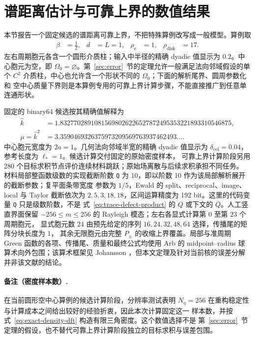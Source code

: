 \section{谱距离估计与可靠上界的数值结果}
\label{sec:results}

本节报告一个固定候选的谱距离可靠上界，不把特殊算例改写成一般模型。算例取
\begin{align*}
  \beta&=\frac12,
  &d&=L=1,
  &\rho_{\mathrm e}&=1,
  &\rho_{\mathrm{disk}}&=17.
\end{align*}
左右周期胞元各含一个圆形介质柱；输入中半径的精确 dyadic 值显示为 $0.2$。中心胞元为空，即
$\Omega_0=\varnothing$。第~\ref{sec:error}~节的定理允许一般满足法向邻域假设的单个
$C^2$ 介质柱，中心也允许含一个形状不同的 $\Omega_0$；下面的解析尾界、圆周参数化和
空中心质量下界则是本算例专用的可靠上界计算步骤，不能直接推广到任意单连通形状。

固定的 binary64 候选按其精确值解释为
\begin{align*}
  \widehat k
  &=1.83277028910815698026226527872495353221893310546875,\\
  \mu=\widehat k^2
  &=3.3590469326375973209569763937462493\ldots.
\end{align*}
中心胞元宽度为 $2a=1$。几何法向邻域半宽的精确 dyadic 值显示为
$\delta_{\mathrm{col}}=0.04$，参考长度为 $\ell_*=1$。候选计算交付固定的原始密度样本，
可靠上界计算阶段另用 280 个目标求积节点评价连续材料跳跃；原始场离散与后续求积承担不同任务。
材料局部整函数级数的实现截断阶数
\texttt{Q} 为 10，即以阶数 10 作为该局部解析展开的截断参数；复平面条带宽度
参数为 $1/5$，Ewald 的 split、reciprocal、image、local 与 Taylor 截断依次为
$2,5,3,18,18$，区间运算精度为 192 bit。这里的代码变量 \texttt{Q} 只是级数阶数，不是
式~\eqref{eq:trace-defect-product} 的 $Q$ 或下文的 $\overline Q$。人工竖直界面保留
$-256\leq m\leq256$ 的 Rayleigh 模态；左右各显式计算第 $0$ 至第 $23$ 个周期胞元，
显式胞元数 $24$ 由预先给定的序列 $16,24,32,48,64$ 选择，传播尾的矩阵分块长度为 $1$，
其余无限胞元由完整 $P_\pm$ 的收缩上界覆盖。局部与准周期 Green 函数的各项、传播尾、质量和最终公式均使用
Arb 的 midpoint--radius 球算术向外包围；该算术框架见 Johansson
\cite{Johansson2017Arb}，但本文定理及针对当前核的误差分解并非该文献的结论。

\paragraph{备注（密度样本数）.}
在当前圆形空中心算例的候选计算阶段，分辨率测试表明
$N_\eta=256$ 在重构稳定性与计算成本之间给出较好的经验折衷，因此本次计算固定这一
样本数，并按式~\eqref{eq:exact-density-dft} 构造有限三角密度。这个数值选择不是
第~\ref{sec:error}~节定理的假设，也不替代可靠上界计算阶段独立的目标求积与误差包围。


